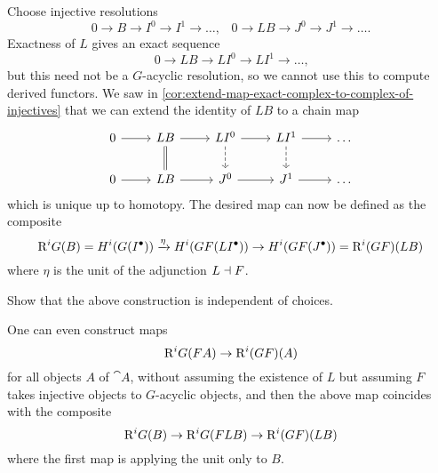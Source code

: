Choose injective resolutions
\[ 0\to B\to I^0\to I^1\to\ldots\text{,} \quad 0\to LB\to J^0\to J^1\to\ldots\text{.} \]
Exactness of \(L\) gives an exact sequence
\[ 0\to LB\to LI^0\to LI^1\to\ldots\text{,} \]
but this need not be a \(G\)-acyclic resolution, so we cannot use this to compute derived functors.
We saw in \cref{cor:extend-map-exact-complex-to-complex-of-injectives} that we can extend the identity of \(LB\) to a chain map
\begin{equation*}
  \begin{tikzcd}
    0 \ar[r] & LB \ar[r] \ar[d, equal] & LI^0 \ar[r] \ar[d, dashed] & LI^1 \ar[r] \ar[d, dashed] & \ldots \\
    0 \ar[r] & LB \ar[r] & J^0 \ar[r] & J^1 \ar[r] & \ldots
  \end{tikzcd}
\end{equation*}
which is unique up to homotopy.
The desired map can now be defined as the composite
\[ \mathrm{R}^iG(B) = H^i(G(I^\bullet)) \xrightarrow{\eta} H^i(GF(LI^\bullet)) \to H^i(GF(J^\bullet)) = \mathrm{R}^i(GF)(LB) \]
where \(\eta\) is the unit of the adjunction \(L\dashv F\).

\begin{exc}
Show that the above construction is independent of choices.
\end{exc}

\begin{rmk}
One can even construct maps
\[ \mathrm{R}^iG(FA) \to \mathrm{R}^i(GF)(A) \]
for all objects \(A\) of \(\cat A\), without assuming the existence of \(L\) but assuming \(F\) takes injective objects to \(G\)-acyclic objects, and then the above map coincides with the composite
\[ \mathrm{R}^iG(B) \to \mathrm{R}^iG(FLB) \to \mathrm{R}^i(GF)(LB) \]
where the first map is applying the unit only to \(B\).
\end{rmk}

